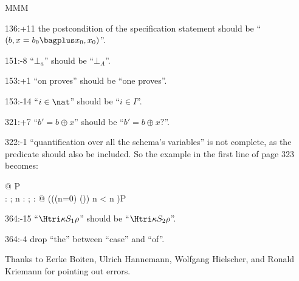 \documentclass[11pt,smallheadings,parskip]{scrartcl}
\begin{document}
\begin{deflist}{MMM}
\item[136:+11] the postcondition of the specification statement should be ``$(b,x = b_0 \bagplus x_0,x_0)$''.
\item[151:-8] ``$\bot_a$'' should be ``$\bot_A$''.
\item[153:+1] ``on proves'' should be ``one proves''.
\item[153:-14] ``$i\in\nat$'' should be ``$i\in I$''.
\item[321:+7] ``$b' = b\oplus x$'' should be ``$b' = b\oplus x?$''.
\item[322:-1] ``quantification over all the schema’s variables'' is not complete, as the predicate should also be included. So the example in the first line of page 323 becomes:

\begin{zed}
  \forall \NonEmptyBagC @ P \iff\\
  \forall \Vsum : \zReal; n : \nat; \elements : \nat @
  (((n=0) \implies ()) \land n < \elements \land  n )\implies P
\end{zed}
\item[364:-15] ``$\Htri\kappa{S_1}\rho$'' should be ``$\Htri\kappa{S_2}\rho$''.
\item[364:-4] drop ``the'' between ``case'' and ``of''.
\end{deflist}
Thanks to Eerke Boiten, Ulrich Hannemann, Wolfgang Hielscher, and Ronald Kriemann for pointing out errors.


\end{document}
